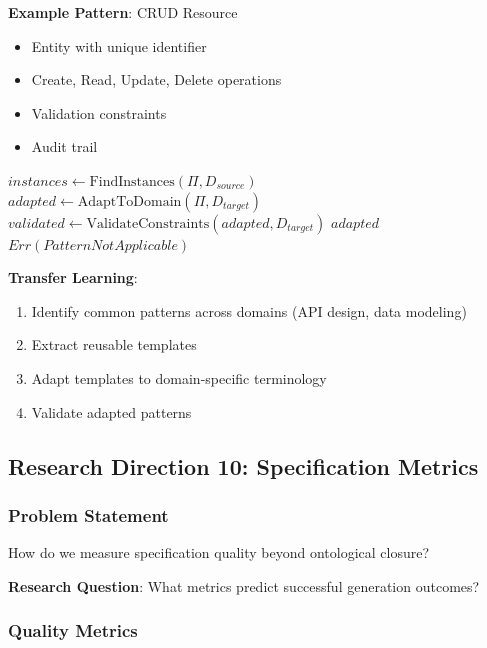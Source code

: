 \textbf{Example Pattern}: CRUD Resource
\begin{itemize}
    \item Entity with unique identifier
    \item Create, Read, Update, Delete operations
    \item Validation constraints
    \item Audit trail
\end{itemize}

\begin{algorithm}
\caption{Pattern Transfer}
\begin{algorithmic}[1]
    \State $instances \gets \text{FindInstances}(\Pi, D_{source})$ 
    \State $adapted \gets \text{AdaptToDomain}(\Pi, D_{target})$ 
    \State $validated \gets \text{ValidateConstraints}(adapted, D_{target})$
        \State \Return $adapted$
    \Else
        \State \Return $Err(PatternNotApplicable)$
    \EndIf
\EndProcedure
\end{algorithmic}
\end{algorithm}

\textbf{Transfer Learning}:
\begin{enumerate}
    \item Identify common patterns across domains (API design, data modeling)
    \item Extract reusable templates
    \item Adapt templates to domain-specific terminology
    \item Validate adapted patterns
\end{enumerate}

\subsection{Research Direction 10: Specification Metrics}

\subsubsection{Problem Statement}

How do we measure specification quality beyond ontological closure?

\textbf{Research Question}: What metrics predict successful generation outcomes?

\subsubsection{Quality Metrics}

